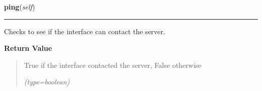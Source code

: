     \label{client_rest:ImagingInterface:ping}

    \vspace{0.5ex}

\hspace{.8\funcindent}\begin{boxedminipage}{\funcwidth}

    \raggedright \textbf{ping}(\textit{self})

    \vspace{-1.5ex}

    \rule{\textwidth}{0.5\fboxrule}
\setlength{\parskip}{2ex}
    Checks to see if the interface can contact the server.

\setlength{\parskip}{1ex}
      \textbf{Return Value}
    \vspace{-1ex}

      \begin{quote}
      True if the interface contacted the server, False otherwise

      {\it (type=boolean)}

      \end{quote}

    \end{boxedminipage}

    \label{client_rest:ImagingInterface:debug}

    \vspace{0.5ex}

